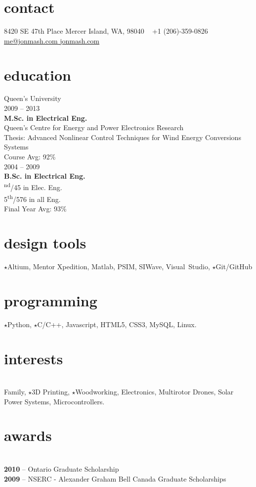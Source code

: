 
\begin{aside}
%
\section{contact}
8420 SE 47th Place
Mercer Island, WA, 98040
~
+1 (206)-359-0826
~
\href{mailto:me@jonmash.com}{me@jonmash.com \faEnvelope}
\href{http://www.jonmash.com}{jonmash.com \faLink}
%
\section{education}
\restorecr
{\headingfont Queen's University}\\
{2009 -- 2013} \\
\textbf{M.Sc. {\normalfont in Electrical Eng.}}\\
{\bodyfontit Queen’s Centre for Energy and Power Electronics Research}\\
Thesis: Advanced Nonlinear Control Techniques for Wind Energy Conversions Systems\\
Course Avg: 92\%\\
\vspace{0.3cm}
{2004 -- 2009} \\
\textbf{B.Sc. {\normalfont in Electrical Eng.}}\\
{\textsuperscript{nd}/45 in Elec. Eng. \\ 5\textsuperscript{th}/576 in all Eng.}\\
Final Year Avg: 93\%\\
%
\section{design tools}
{\color{orange} $\star$}Altium, Mentor Xpedition, Matlab, PSIM, SIWave, Visual~Studio, {\color{orange} $\star$}Git/GitHub
%
\section{programming}
{\color{orange} $\star$}Python, {\color{orange} $\star$}C/C++, Javascript, HTML5, CSS3, MySQL, Linux.
%
\section{interests}\\
Family, {\color{orange} $\star$}3D Printing, {\color{orange} $\star$}Woodworking, Electronics, Multirotor Drones, Solar Power Systems, Microcontrollers.
%
\section{awards}\\
{\textbf{2010}} -- {\bodyfontit Ontario Graduate Scholarship}\\
\vspace{0.3cm}
{\textbf{2009}} -- {\bodyfontit NSERC - Alexander Graham Bell Canada Graduate Scholarships}\\
\obeycr
\end{aside}